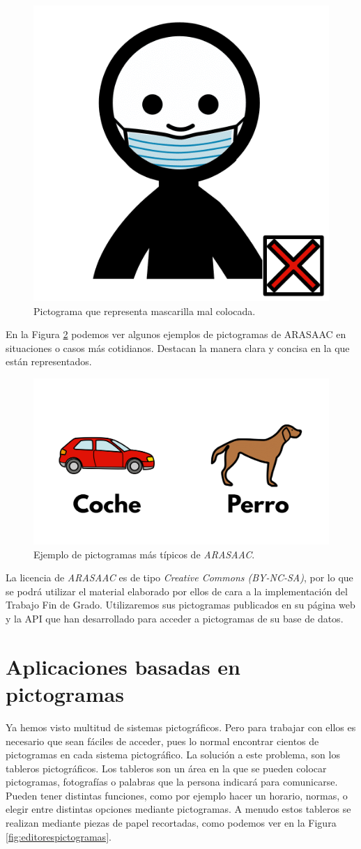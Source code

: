 \begin{figure}[h!]
	\centering
	\includegraphics[width=0.2\linewidth]{Imagenes/Bitmap/Mascarilla mal colocada}
	\caption{Pictograma que representa mascarilla mal colocada.}
	\label{fig:picto-mascarilla-mal-colocada}
\end{figure}

En la Figura \ref{fig:arasaacpictos} podemos ver algunos ejemplos de pictogramas de ARASAAC en situaciones o casos más cotidianos. Destacan la manera clara y concisa en la que están representados. 

\begin{figure}[h!]
	\centering
	\includegraphics[width=0.7\linewidth]{Imagenes/Bitmap/ARASAACPictos}
	\caption{Ejemplo de pictogramas más típicos de \textit{ARASAAC}.}
	\label{fig:arasaacpictos}
\end{figure}

La licencia de \textit{ARASAAC} es de tipo \textit{Creative Commons (BY-NC-SA)}, por lo que se podrá utilizar el material elaborado por ellos de cara a la implementación del Trabajo Fin de Grado. Utilizaremos sus pictogramas publicados en su página web y la API que han desarrollado para acceder a pictogramas de su base de datos.

\section{Aplicaciones basadas en pictogramas}
\label{cap3:sec:editor-tableros}

Ya hemos visto multitud de sistemas pictográficos. Pero para trabajar con ellos es necesario que sean fáciles de acceder, pues lo normal encontrar cientos de pictogramas en cada sistema pictográfico. La solución a este problema, son los tableros pictográficos. Los tableros son un área en la que se pueden colocar pictogramas, fotografías o palabras que la persona indicará para comunicarse. Pueden tener distintas funciones, como por ejemplo hacer un horario, normas, o elegir entre distintas opciones mediante pictogramas. A menudo estos tableros se realizan mediante piezas de papel recortadas, como podemos ver en la Figura \ref{fig:editorespictogramas}.

